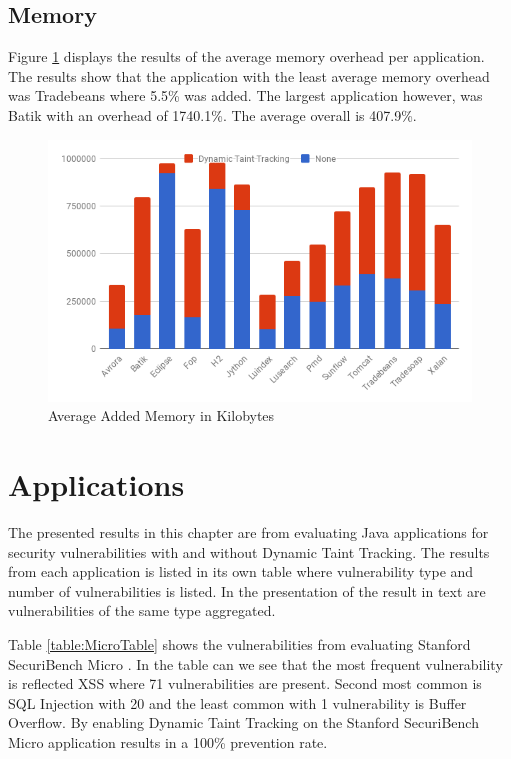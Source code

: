\subsection{Memory}
Figure \ref{fig:Memory} displays the results of the average memory overhead per application. The results show that the application with the least average memory overhead was Tradebeans where 5.5\% was added. The largest application however, was Batik with an overhead of 1740.1\%. The average overall is 407.9\%.

\begin{figure}[!hbt]
	\centering
	\includegraphics[width=\textwidth]{images/Memory.png}
	\caption{Average Added Memory in Kilobytes}
	\label{fig:Memory}
\end{figure}



\section{Applications}
\label{Applications}
The presented results in this chapter are from evaluating Java applications for security vulnerabilities with and without Dynamic Taint Tracking. The results from each application is listed in its own table where vulnerability type and number of vulnerabilities is listed. In the presentation of the result in text are vulnerabilities of the same type aggregated.

Table \ref{table:MicroTable} shows the vulnerabilities from evaluating Stanford SecuriBench Micro \parencite{securiBenchMicro}. In the table can we see that the most frequent vulnerability is reflected XSS where 71 vulnerabilities are present. Second most common is SQL Injection with 20 and the least common with 1 vulnerability is Buffer Overflow. By enabling Dynamic Taint Tracking on the Stanford SecuriBench Micro \parencite{securiBenchMicro} application results in a 100\% prevention rate.


